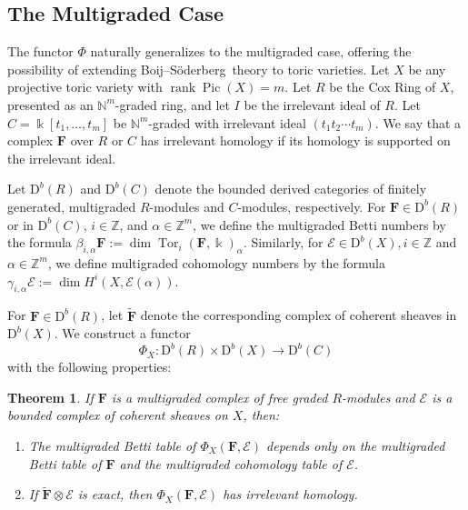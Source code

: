 \documentclass[12pt]{amsart}
\newtheorem{theorem}[lemma]{Theorem}
\theoremstyle{definition}
\theoremstyle{remark}
\newcommand{\Pic}{\operatorname{Pic}}
\newcommand{\Tor}{\operatorname{Tor}}
\newcommand{\kk}{\Bbbk}
\newcommand{\rank}{\operatorname{rank}}
\newcommand{\ZZ}{\mathbb{Z}}
\newcommand{\cE}{\mathcal{E}}
\newcommand{\FF}{\mathbf{F}}
\newcommand{\defi}[1]{\textsf{#1}} %
\newcommand{\DD}{\mathrm{D}}
\def\BS{Boij--S\"oderberg~}
\begin{document}
\subsection*{The Multigraded Case}
The functor $\Phi$ naturally generalizes to the multigraded case, offering the possibility of extending \BS theory to toric varieties.  Let $X$ be any projective toric variety with $\rank \Pic(X)=m$.  Let $R$ be the Cox Ring of $X$, presented as an $\mathbb N^m$-graded ring, and let $I$ be the irrelevant ideal of $R$.  Let $C=\kk[t_1, \dots, t_m]$ be $\mathbb N^m$-graded with irrelevant ideal $(t_1t_2\cdots t_m)$.  We say that a complex $\FF$ over $R$ or $C$ has \defi{irrelevant homology} if its homology is supported on the irrelevant ideal.

Let $\DD^b(R)$ and $\DD^b(C)$ denote the bounded derived categories of finitely generated, multigraded $R$-modules and $C$-modules, respectively.   For $\FF\in \DD^b(R)$ or in $\DD^b(C)$, $i\in \ZZ$, and $\alpha\in \ZZ^m$, we define the multigraded Betti numbers by the formula $\beta_{i,\alpha} \FF:=\dim \Tor_i(\FF,\kk)_{\alpha}$.  Similarly, for $\cE\in \DD^b(X), i\in \ZZ$ and $\alpha\in \ZZ^m$, we define multigraded cohomology numbers by the formula $\gamma_{i,\alpha} \cE:=\dim H^i(X, \cE(\alpha))$.  


For  $\FF\in \DD^b(R)$, let $\widetilde{\FF}$ denote the corresponding complex of coherent sheaves in $\DD^b(X)$.  We construct a functor
\[
\Phi_{X}: \DD^b(R)\times \DD^b(X)\to \DD^b(C)
\]
with the following properties:
\begin{theorem}\label{thm:Phimulti}
If $\FF$ is a multigraded complex of free graded $R$-modules and $\cE$ is a bounded complex of coherent sheaves on $X$, then:
\begin{enumerate} 
	\item\label{thm:Phi':1}  The multigraded Betti table of $\Phi_{X}(\FF,\cE)$ depends only on the multigraded Betti table of $\FF$ and the multigraded cohomology table of $\cE$.
	\item\label{thm:Phi':2}  If $\widetilde{\FF}\otimes \cE$ is exact, then $\Phi_{X}(\FF,\cE)$ has irrelevant homology.  
\end{enumerate}
\end{theorem}
\end{document}
